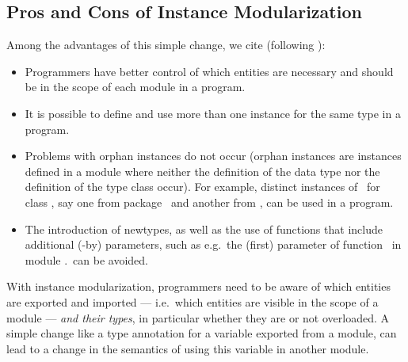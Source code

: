 \subsection{Pros and Cons of Instance Modularization}

Among the advantages of this simple change, we cite (following
\cite{Controlling-scope-instances}):

\begin{itemize}

  \item Programmers have better control of which entities are
    necessary and should be in the scope of each module in a program.

  \item It is possible to define and use more than one instance for
    the same type in a program.

  \item Problems with orphan instances do not occur (orphan instances
    are instances defined in a module where neither the definition of
    the data type nor the definition of the type class occur). For
    example, distinct instances of \Either\ for class \Monad, say one
    from package \mtl\ and another from \transformers, can be used in
    a program.

  \item The introduction of newtypes, as well as the use of functions
    that include additional (-by) parameters, such as e.g.~the (first)
    parameter of function \sortBy\ in module \Data.\List\ can be
    avoided.

\end{itemize}

With instance modularization, programmers need to be aware of which
entities are exported and imported --- i.e.~which entities are visible
in the scope of a module --- {\em and their types}, in particular
whether they are or not overloaded. A simple change like a type
annotation for a variable exported from a module, can lead to a change
in the semantics of using this variable in another module.






